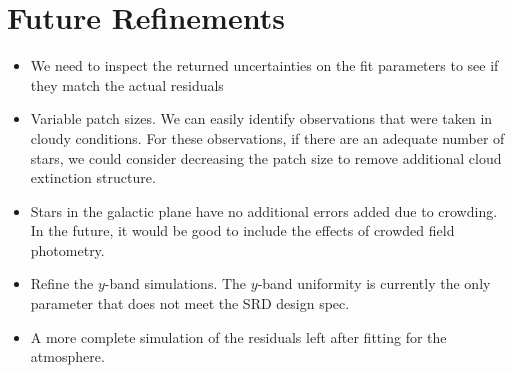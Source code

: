 \documentclass[12pt,preprint]{aastex}
\begin{document}
\section{Future Refinements}
\begin{itemize}
\item{We need to inspect the returned uncertainties on the fit parameters to see if they match the actual residuals}
\item{Variable patch sizes.  We can easily identify observations that were taken in cloudy conditions.  For these observations, if there are an adequate number of stars, we could consider decreasing the patch size to remove additional cloud extinction structure.}
\item{Stars in the galactic plane have no additional errors added due to crowding.  In the future, it would be good to include the effects of crowded field photometry.  }
\item{Refine the $y$-band simulations.  The $y$-band uniformity is currently the only parameter that does not meet the SRD design spec.}
\item{A more complete simulation of the residuals left after fitting for the atmosphere.}
\end{itemize}



\end{document}
